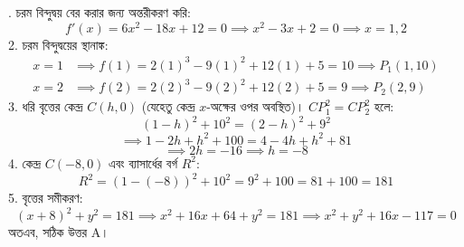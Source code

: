 \documentclass[12pt, a4paper]{article}
\begin{document}
\begin{tcolorbox}[solutionbox={সমাধান (Solution)}]
    . চরম বিন্দুদ্বয় বের করার জন্য অন্তরীকরণ করি:
    \[ f'(x) = 6x^2 - 18x + 12 = 0 \implies x^2 - 3x + 2 = 0 \implies x = 1, 2 \]
    2. চরম বিন্দুদ্বয়ের স্থানাঙ্ক:
    \begin{align*}
        x = 1 &\implies f(1) = 2(1)^3 - 9(1)^2 + 12(1) + 5 = 10 \implies P_1(1, 10) \\
        x = 2 &\implies f(2) = 2(2)^3 - 9(2)^2 + 12(2) + 5 = 9 \implies P_2(2, 9)
    \end{align*}
    3. ধরি বৃত্তের কেন্দ্র $C(h, 0)$ (যেহেতু কেন্দ্র $x$-অক্ষের ওপর অবস্থিত)। $CP_1^2 = CP_2^2$ হলে:
    \[ (1 - h)^2 + 10^2 = (2 - h)^2 + 9^2 \]
    \[ \implies 1 - 2h + h^2 + 100 = 4 - 4h + h^2 + 81 \]
    \[ \implies 2h = -16 \implies h = -8 \]
    4. কেন্দ্র $C(-8, 0)$ এবং ব্যাসার্ধের বর্গ $R^2$:
    \[ R^2 = (1 - (-8))^2 + 10^2 = 9^2 + 100 = 81 + 100 = 181 \]
    5. বৃত্তের সমীকরণ:
    \[ (x + 8)^2 + y^2 = 181 \implies x^2 + 16x + 64 + y^2 = 181 \implies x^2 + y^2 + 16x - 117 = 0 \]
    অতএব, সঠিক উত্তর A।
\end{tcolorbox}
\end{document}
